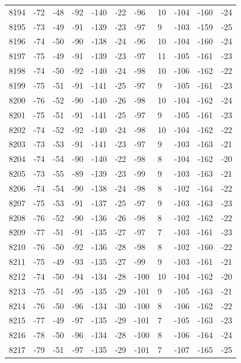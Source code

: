 \begin{table}[H]
\begin{tabular}{lllllllllll}
8194 & -72 & -48 & -92 & -140 & -22 & -96 & 10 & -104 & -160 & -24 \\
8195 & -73 & -49 & -91 & -139 & -23 & -97 & 9 & -103 & -159 & -25 \\
8196 & -74 & -50 & -90 & -138 & -24 & -96 & 10 & -104 & -160 & -24 \\
8197 & -75 & -49 & -91 & -139 & -23 & -97 & 11 & -105 & -161 & -23 \\
8198 & -74 & -50 & -92 & -140 & -24 & -98 & 10 & -106 & -162 & -22 \\
8199 & -75 & -51 & -91 & -141 & -25 & -97 & 9 & -105 & -161 & -23 \\
8200 & -76 & -52 & -90 & -140 & -26 & -98 & 10 & -104 & -162 & -24 \\
8201 & -75 & -51 & -91 & -141 & -25 & -97 & 9 & -105 & -161 & -23 \\
8202 & -74 & -52 & -92 & -140 & -24 & -98 & 10 & -104 & -162 & -22 \\
8203 & -73 & -53 & -91 & -141 & -23 & -97 & 9 & -103 & -163 & -21 \\
8204 & -74 & -54 & -90 & -140 & -22 & -98 & 8 & -104 & -162 & -20 \\
8205 & -73 & -55 & -89 & -139 & -23 & -99 & 9 & -103 & -163 & -21 \\
8206 & -74 & -54 & -90 & -138 & -24 & -98 & 8 & -102 & -164 & -22 \\
8207 & -75 & -53 & -91 & -137 & -25 & -97 & 9 & -103 & -163 & -23 \\
8208 & -76 & -52 & -90 & -136 & -26 & -98 & 8 & -102 & -162 & -22 \\
8209 & -77 & -51 & -91 & -135 & -27 & -97 & 7 & -103 & -161 & -23 \\
8210 & -76 & -50 & -92 & -136 & -28 & -98 & 8 & -102 & -160 & -22 \\
8211 & -75 & -49 & -93 & -135 & -27 & -99 & 9 & -103 & -161 & -21 \\
8212 & -74 & -50 & -94 & -134 & -28 & -100 & 10 & -104 & -162 & -20 \\
8213 & -75 & -51 & -95 & -135 & -29 & -101 & 9 & -105 & -163 & -21 \\
8214 & -76 & -50 & -96 & -134 & -30 & -100 & 8 & -106 & -162 & -22 \\
8215 & -77 & -49 & -97 & -135 & -29 & -101 & 7 & -105 & -163 & -23 \\
8216 & -78 & -50 & -96 & -134 & -28 & -100 & 8 & -106 & -164 & -24 \\
8217 & -79 & -51 & -97 & -135 & -29 & -101 & 7 & -107 & -165 & -25 \\

\end{tabular}
\end{table}
